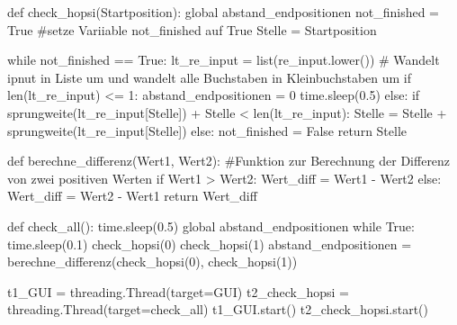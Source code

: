 \documentclass[a4paper,10pt,ngerman]{scrartcl}
\begin{document}
\begin{python}
def check_hopsi(Startposition):
    global abstand_endpositionen
    not_finished = True #setze Variiable not_finished auf True
    Stelle = Startposition

    while not_finished == True:
        lt_re_input = list(re_input.lower()) # Wandelt ipnut in Liste um und wandelt alle Buchstaben in Kleinbuchstaben um
        if len(lt_re_input) <= 1:
            abstand_endpositionen = 0
            time.sleep(0.5)
        else:
            if sprungweite(lt_re_input[Stelle]) + Stelle < len(lt_re_input):
                Stelle = Stelle + sprungweite(lt_re_input[Stelle])
            else:
                not_finished = False
    return Stelle


def berechne_differenz(Wert1, Wert2): #Funktion zur Berechnung der Differenz von zwei positiven Werten
    if Wert1 > Wert2:
        Wert_diff = Wert1 - Wert2
    else:
        Wert_diff = Wert2 - Wert1
    return Wert_diff


def check_all():
    time.sleep(0.5)
    global abstand_endpositionen
    while True:
        time.sleep(0.1)
        check_hopsi(0)
        check_hopsi(1)
        abstand_endpositionen = berechne_differenz(check_hopsi(0), check_hopsi(1))



t1_GUI = threading.Thread(target=GUI) 
t2_check_hopsi = threading.Thread(target=check_all)
t1_GUI.start()
t2_check_hopsi.start()
\end{python}
\end{document}
